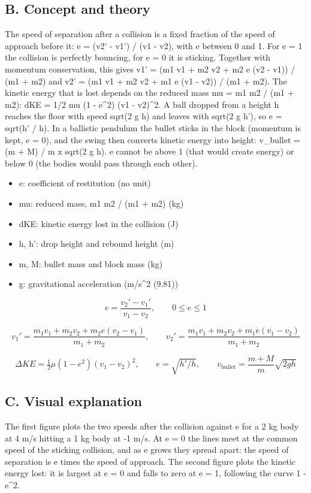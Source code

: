 \documentclass[11pt,a4paper]{article}
\begin{document}
\subsection*{B. Concept and theory}
The speed of separation after a collision is a fixed fraction of the speed of approach before it: e = (v2' - v1') / (v1 - v2), with e between 0 and 1. For e = 1 the collision is perfectly bouncing, for e = 0 it is sticking. Together with momentum conservation, this gives v1' = (m1 v1 + m2 v2 + m2 e (v2 - v1)) / (m1 + m2) and v2' = (m1 v1 + m2 v2 + m1 e (v1 - v2)) / (m1 + m2). The kinetic energy that is lost depends on the reduced mass mu = m1 m2 / (m1 + m2): dKE = 1/2 mu (1 - e\textasciicircum{}2) (v1 - v2)\textasciicircum{}2. A ball dropped from a height h reaches the floor with speed sqrt(2 g h) and leaves with sqrt(2 g h'), so e = sqrt(h' / h). In a ballistic pendulum the bullet sticks in the block (momentum is kept, e = 0), and the swing then converts kinetic energy into height: v\_bullet = (m + M) / m x sqrt(2 g h). e cannot be above 1 (that would create energy) or below 0 (the bodies would pass through each other).

\begin{itemize}[nosep]
\item e: coefficient of restitution (no unit)
\item mu: reduced mass, m1 m2 / (m1 + m2) (kg)
\item dKE: kinetic energy lost in the collision (J)
\item h, h': drop height and rebound height (m)
\item m, M: bullet mass and block mass (kg)
\item g: gravitational acceleration (m/s\textasciicircum{}2 (9.81))
\end{itemize}

\[ e = \frac{v_2' - v_1'}{v_1 - v_2},\qquad 0 \le e \le 1 \]

\[ v_1' = \frac{m_1 v_1 + m_2 v_2 + m_2 e (v_2 - v_1)}{m_1 + m_2},\qquad v_2' = \frac{m_1 v_1 + m_2 v_2 + m_1 e (v_1 - v_2)}{m_1 + m_2} \]

\[ \Delta KE = \tfrac{1}{2}\mu (1 - e^{2})(v_1 - v_2)^{2},\qquad e = \sqrt{h'/h},\qquad v_{\mathrm{bullet}} = \frac{m + M}{m}\sqrt{2 g h} \]

\subsection*{C. Visual explanation}
The first figure plots the two speeds after the collision against e for a 2 kg body at 4 m/s hitting a 1 kg body at -1 m/s. At e = 0 the lines meet at the common speed of the sticking collision, and as e grows they spread apart: the speed of separation is e times the speed of approach. The second figure plots the kinetic energy lost: it is largest at e = 0 and falls to zero at e = 1, following the curve 1 - e\textasciicircum{}2.
\end{document}
